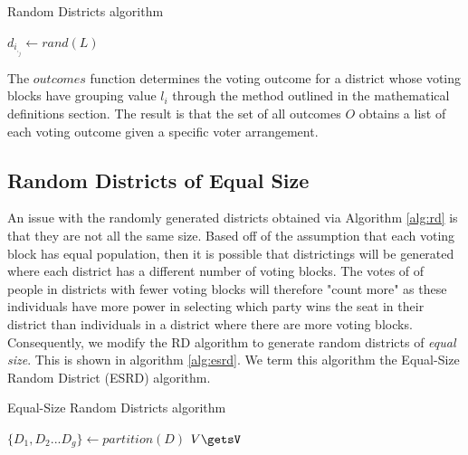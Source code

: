 \documentclass[12pt]{article}
\begin{document}
\begin{algorithm}
\caption{Random Districts algorithm}\label{alg:rd}
\begin{algorithmic}[]
    \State $d_i_,_j \gets rand(L)$ 
\EndFor
{}
\EndFor
\EndProcedure
\end{algorithmic}
\end{algorithm}

    The $outcomes$ function determines the voting outcome for a district whose voting blocks have grouping value $l_i$ through the method outlined in the mathematical definitions section. The result is that the set of all outcomes $O$ obtains a list of each voting outcome given a specific voter arrangement.

\subsection{Random Districts of Equal Size}
An issue with the randomly generated districts obtained via Algorithm \ref{alg:rd} is that they are not all the same size. Based off of the assumption that each voting block has equal population, then it is possible that districtings will be generated where each district has a different number of voting blocks. The votes of of people in districts with fewer voting blocks will therefore "count more" as these individuals have more power in selecting which party wins the seat in their district than individuals in a district where there are more voting blocks. Consequently, we modify the RD algorithm to generate random districts of \textit{equal size}. This is shown in algorithm \ref{alg:esrd}. We term this algorithm the Equal-Size Random District (ESRD) algorithm.

\begin{algorithm}
\caption{Equal-Size Random Districts algorithm}\label{alg:esrd}
\begin{algorithmic}[]
\State $\{D_1, D_2...D_g\} \gets partition(D)$ 
        \State $V\getsV$\Comment{}
    \EndFor
\EndFor
{}
\EndFor
\EndProcedure
\end{algorithmic}
\end{algorithm}
\end{document}
